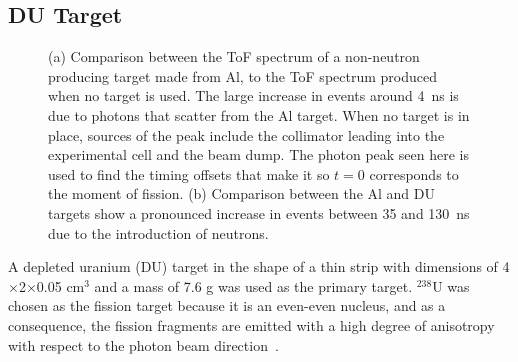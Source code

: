 \subsection{DU Target}
\label{subsection:targets}
\begin{figure}[]
\centering
     \figToFNewline
    \caption{(a) Comparison between the ToF spectrum of a non-neutron producing target made from Al, to the ToF spectrum produced when no target is used.
    The large increase in events around 4~ns is due to photons that scatter from the Al target.
    When no target is in place, sources of the peak include the collimator leading into the experimental cell and the beam dump.
    The photon peak seen here is used to find the timing offsets that make it so $t=0$ corresponds to the moment of fission.
    (b) Comparison between the Al and DU targets show a pronounced increase in events between 35 and 130~ns due to the introduction of neutrons.}
    \label{fig:ToF}
\end{figure}
A depleted uranium (DU) target in the shape of a thin strip with dimensions of 4$\times$2$\times$0.05 $\text{cm}^3$ and a mass of 7.6 g was used as the primary target.
$^{238}$U was chosen as the fission target because it is an even-even nucleus, and as a consequence, the fission fragments are emitted with a high degree of anisotropy with respect to the photon beam direction~\cite{1977FragAss}.

